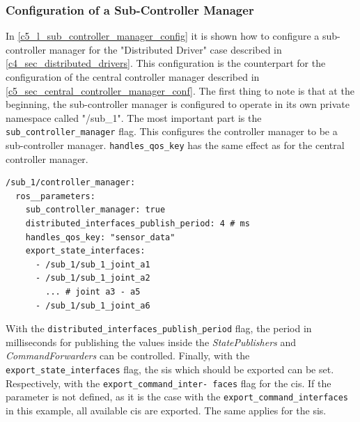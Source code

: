 \subsubsection{Configuration of a Sub-Controller Manager}\label{c5_sec_sub_controller_configuration}
In \autoref{c5_l_sub_controller_manager_config} it is shown how to configure a sub-controller manager for the "Distributed Driver" case described in \autoref{c4_sec_distributed_drivers}. This configuration is the counterpart for the configuration of the central controller manager described in \autoref{c5_sec_central_controller_manager_conf}.\newline
The first thing to note is that at the beginning, the sub-controller manager is configured to operate in its own private namespace called "/sub\_1". The most important part is the \lstset{language=yaml,basicstyle=\small\ttfamily, breaklines=true}\lstinline{sub_controller_manager} flag. This configures the controller manager to be a sub-controller manager. \lstset{language=yaml,basicstyle=\small\ttfamily, breaklines=true}\lstinline{handles_qos_key} has the same effect as for the central controller manager.
\lstset{language=yaml,basicstyle=\small}
\begin{lstlisting}[caption=Example configuration of a sub-controller manager which exports all of it's command and state interfaces.,label=c5_l_sub_controller_manager_config]
/sub_1/controller_manager:
  ros__parameters:
    sub_controller_manager: true
    distributed_interfaces_publish_period: 4 # ms
    handles_qos_key: "sensor_data"
    export_state_interfaces:
      - /sub_1/sub_1_joint_a1
      - /sub_1/sub_1_joint_a2
        ... # joint a3 - a5
      - /sub_1/sub_1_joint_a6
\end{lstlisting}
With the \lstset{language=yaml,basicstyle=\small\ttfamily, breaklines=true}\lstinline{distributed_interfaces_publish_period} flag, the period in milliseconds for publishing the values inside the \textit{StatePublishers} and \textit{CommandForwarders} can be controlled. Finally, with the 
\lstset{language=yaml,basicstyle=\small\ttfamily, breaklines=true}\lstinline{export_state_interfaces} flag, the \glspl{si} which should be exported can be set. Respectively, with the \lstset{language=yaml,basicstyle=\small\ttfamily, breaklines=true}\lstinline{export_command_inter- faces} flag for the \glspl{ci}. If the parameter is not defined, as it is the case with the \lstset{language=yaml,basicstyle=\small\ttfamily, breaklines=true}\lstinline{export_command_interfaces} in this example, all available \glspl{ci} are exported. The same applies for the \glspl{si}.

